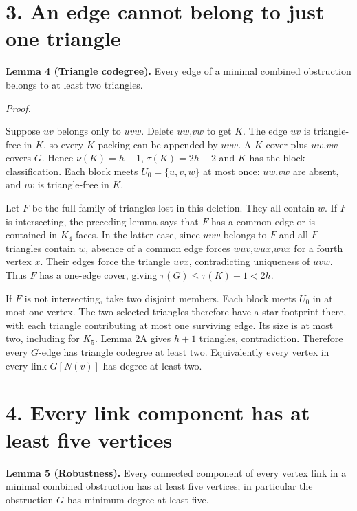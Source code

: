 \documentclass[11pt]{article}
\begin{document}
\section{3. An edge cannot belong to just one
triangle}\label{an-edge-cannot-belong-to-just-one-triangle}

\textbf{Lemma 4 (Triangle codegree).} Every edge of a minimal combined
obstruction belongs to at least two triangles.

\emph{Proof.}

Suppose \(uv\) belongs only to \(uvw\). Delete \(uw\),\(vw\) to get
\(K\). The edge \(uv\) is triangle-free in \(K\), so every \(K\)-packing
can be appended by \(uvw\). A \(K\)-cover plus \(uw\),\(vw\) covers
\(G\). Hence \(\nu(K)=h-1\), \(\tau(K)=2h-2\) and \(K\) has the block
classification. Each block meets \(U_0=\{u,v,w\}\) at most once:
\(uw\),\(vw\) are absent, and \(uv\) is triangle-free in \(K\).

Let \(F\) be the full family of triangles lost in this deletion. They
all contain \(w\). If \(F\) is intersecting, the preceding lemma says
that \(F\) has a common edge or is contained in \(K_4\) faces. In the
latter case, since \(uvw\) belongs to \(F\) and all \(F\)-triangles
contain \(w\), absence of a common edge forces \(wuv\),\(wux\),\(wvx\)
for a fourth vertex \(x\). Their edges force the triangle \(uvx\),
contradicting uniqueness of \(uvw\). Thus \(F\) has a one-edge cover,
giving \(\tau(G)\le \tau(K)+1<2h\).

If \(F\) is not intersecting, take two disjoint members. Each block
meets \(U_0\) in at most one vertex. The two selected triangles
therefore have a star footprint there, with each triangle contributing
at most one surviving edge. Its size is at most two, including for
\(K_5\). Lemma 2A gives \(h+1\) triangles, contradiction. Therefore
every \(G\)-edge has triangle codegree at least two. Equivalently every
vertex in every link \(G[N(v)]\) has degree at least two.

\section{4. Every link component has at least five
vertices}\label{every-link-component-has-at-least-five-vertices}

\textbf{Lemma 5 (Robustness).} Every connected component of every vertex
link in a minimal combined obstruction has at least five vertices; in
particular the obstruction \(G\) has minimum degree at least five.
\end{document}

